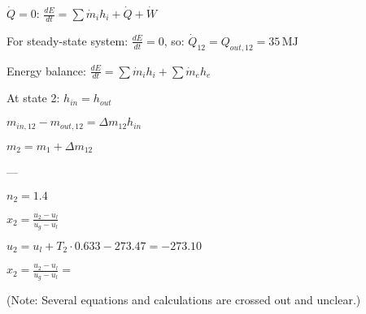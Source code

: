 \( \dot{Q} = 0 \):  
\( \frac{dE}{dt} = \sum \dot{m}_i h_i + \dot{Q} + \dot{W} \)  

For steady-state system:  
\( \frac{dE}{dt} = 0 \), so:  
\( \dot{Q}_{12} = Q_{out,12} = 35 \, \text{MJ} \)  

Energy balance:  
\( \frac{dE}{dt} = \sum \dot{m}_i h_i + \sum \dot{m}_e h_e \)  

At state 2:  
\( h_{in} = h_{out} \)  

\( m_{in,12} - m_{out,12} = \Delta m_{12} h_{in} \)  

\( m_2 = m_1 + \Delta m_{12} \)  

---

\( n_2 = 1.4 \)  

\( x_2 = \frac{u_2 - u_l}{u_g - u_l} \)  

\( u_2 = u_l + T_2 \cdot 0.633 - 273.47 = -273.10 \)  

\( x_2 = \frac{u_2 - u_l}{u_g - u_l} = \)  

(Note: Several equations and calculations are crossed out and unclear.)